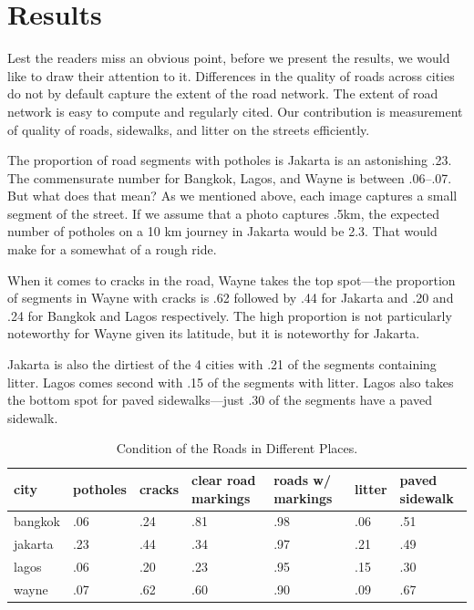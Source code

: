 \documentclass[12pt, letterpaper]{article}
\begin{document}
\section*{Results}
Lest the readers miss an obvious point, before we present the results, we would like to draw their attention to it. Differences in the quality of roads across cities do not by default capture the extent of the road network. The extent of road network is easy to compute and regularly cited. Our contribution is  measurement of quality of roads, sidewalks, and litter on the streets efficiently.

The proportion of road segments with potholes is Jakarta is an astonishing .23. The commensurate number for Bangkok, Lagos, and Wayne is between .06--.07. But what does that mean? As we mentioned above, each image captures a small segment of the street. If we assume that a photo captures .5km, the expected number of potholes on a 10 km journey in Jakarta would be 2.3. That would make for a somewhat of a rough ride.

When it comes to cracks in the road, Wayne takes the top spot---the proportion of segments in Wayne with cracks is .62 followed by .44 for Jakarta and .20 and .24 for Bangkok and Lagos respectively. The high proportion is not particularly noteworthy for Wayne given its latitude, but it is noteworthy for Jakarta. 

Jakarta is also the dirtiest of the 4 cities with .21 of the segments containing litter.  Lagos comes second with .15 of the segments with litter. Lagos also takes the bottom spot for paved sidewalks---just .30 of the segments have a paved sidewalk.

\begin{table}[h]
\centering
\caption{Condition of the Roads in Different Places.}
\label{my-label}
\begin{tabular}{@{}lllllll@{}}
\toprule
city    & potholes & cracks & clear road markings & roads w/ markings & litter & paved sidewalk \\ \midrule
bangkok & .06      & .24    & .81                 & .98               & .06    & .51            \\
jakarta & .23      & .44    & .34                 & .97               & .21    & .49            \\
lagos   & .06      & .20    & .23                 & .95               & .15    & .30            \\
wayne   & .07      & .62    & .60                 & .90               & .09    & .67            \\ \bottomrule
\end{tabular}
\end{table}
\end{document}
